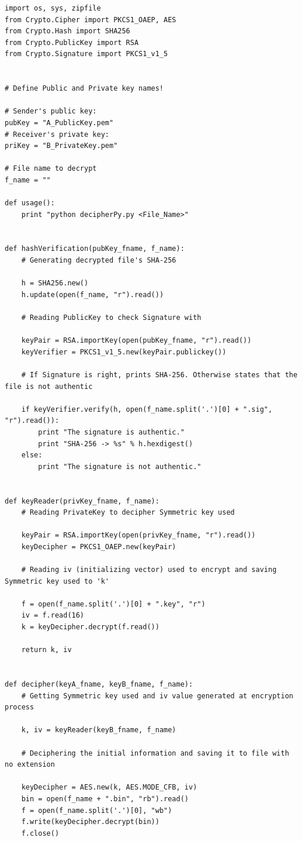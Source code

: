 \documentclass[a4paper,11pt,openright,oneside]{report}
\begin{document}
\begin{verbatim}
import os, sys, zipfile
from Crypto.Cipher import PKCS1_OAEP, AES
from Crypto.Hash import SHA256
from Crypto.PublicKey import RSA
from Crypto.Signature import PKCS1_v1_5


# Define Public and Private key names!

# Sender's public key:
pubKey = "A_PublicKey.pem"
# Receiver's private key:
priKey = "B_PrivateKey.pem"

# File name to decrypt
f_name = ""

def usage():
    print "python decipherPy.py <File_Name>"


def hashVerification(pubKey_fname, f_name):
    # Generating decrypted file's SHA-256

    h = SHA256.new()
    h.update(open(f_name, "r").read())

    # Reading PublicKey to check Signature with

    keyPair = RSA.importKey(open(pubKey_fname, "r").read())
    keyVerifier = PKCS1_v1_5.new(keyPair.publickey())

    # If Signature is right, prints SHA-256. Otherwise states that the file is not authentic

    if keyVerifier.verify(h, open(f_name.split('.')[0] + ".sig", "r").read()):
        print "The signature is authentic."
        print "SHA-256 -> %s" % h.hexdigest()
    else:
        print "The signature is not authentic."


def keyReader(privKey_fname, f_name):
    # Reading PrivateKey to decipher Symmetric key used

    keyPair = RSA.importKey(open(privKey_fname, "r").read())
    keyDecipher = PKCS1_OAEP.new(keyPair)

    # Reading iv (initializing vector) used to encrypt and saving Symmetric key used to 'k'

    f = open(f_name.split('.')[0] + ".key", "r")
    iv = f.read(16)
    k = keyDecipher.decrypt(f.read())

    return k, iv


def decipher(keyA_fname, keyB_fname, f_name):
    # Getting Symmetric key used and iv value generated at encryption process

    k, iv = keyReader(keyB_fname, f_name)

    # Deciphering the initial information and saving it to file with no extension

    keyDecipher = AES.new(k, AES.MODE_CFB, iv)
    bin = open(f_name + ".bin", "rb").read()
    f = open(f_name.split('.')[0], "wb")
    f.write(keyDecipher.decrypt(bin))
    f.close()


\end{verbatim}
\end{document}
